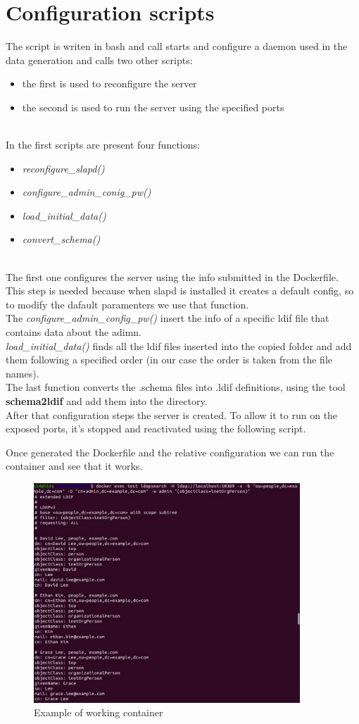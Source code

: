 \section{Configuration scripts}
The script is writen in bash and call starts and configure a daemon used in the data generation and calls two other scripts:
\begin{itemize}
    \item the first is used to reconfigure the server
    \item the second is used to run the server using the specified ports
\end{itemize}
\\
In the first scripts are present four functions:\\
\begin{itemize}
    \item \textit{reconfigure\_slapd()}
    \item \textit{configure\_admin\_conig\_pw()}
    \item \textit{load\_initial\_data()}
    \item \textit{convert\_schema()}
\end{itemize}
\\
The first one configures the server using the info submitted in the Dockerfile. This step is needed because when slapd is installed it creates a default config, so to modify the dafault paramenters we use that function.
\\
The \textit{configure\_admin\_config\_pw()} insert the info of a specific ldif file that contains data about the adimn.
\\
\textit{load\_initial\_data()} finds all the ldif files inserted into the copied folder and add them following a specified order (in our case the order is taken from the file names).
\\
The last function converts the .schema files into .ldif definitions, using the tool \textbf{schema2ldif} \cite{schema2ldif} and add them into the directory.
\\
After that configuration steps the server is created. To allow it to run on the exposed ports, it's stopped and reactivated using the following script.
\begin{mdframed}[backgroundcolor=back]

\end{mdframed}
Once generated the Dockerfile and the relative configuration we can run the container and see that it works.
\begin{figure}[h]
    \caption{Example of working container}
    \centering
    \includegraphics[width=10cm]{img/search.jpg}
\end{figure}
